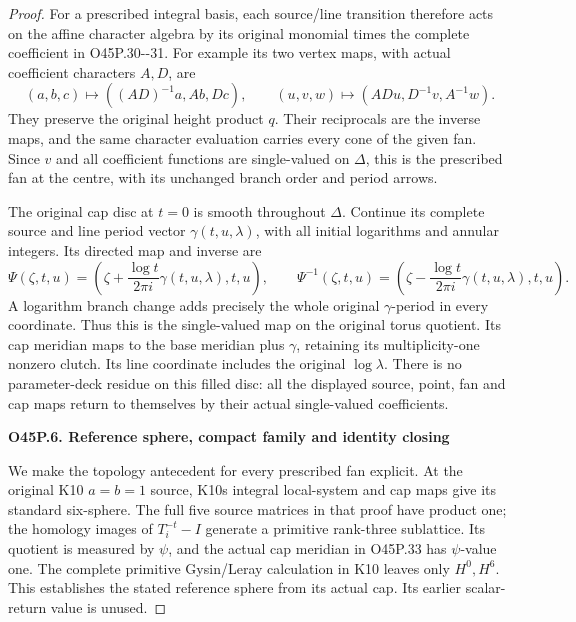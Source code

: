 \begin{proof}
For a prescribed integral basis, each source/line transition
therefore acts on the affine character algebra by its original
monomial times the complete coefficient in O45P.30-\/-31.
For example its two vertex maps, with actual coefficient
characters \(A,D\), are
\[
 (a,b,c)\mapsto((AD)^{-1}a,Ab,Dc),\qquad
 (u,v,w)\mapsto(ADu,D^{-1}v,A^{-1}w).
 \tag{O45P.32}
\]
They preserve the original height product \(q\).
Their reciprocals are the inverse maps, and the same
character evaluation carries every cone of the given fan.
Since \(v\) and all coefficient functions are single-valued
on \(\Delta\), this is the prescribed fan at the centre,
with its unchanged branch order and period arrows.

The original cap disc at \(t=0\) is smooth throughout
\(\Delta\). Continue its complete source and line period
vector \(\gamma(t,u,\lambda)\), with all initial logarithms
and annular integers. Its directed map and inverse are
\[
 \Psi(\zeta,t,u)=
   \left(\zeta+\frac{\log t}{2\pi i}\gamma(t,u,\lambda),t,u\right),
 \qquad
 \Psi^{-1}(\zeta,t,u)=
   \left(\zeta-\frac{\log t}{2\pi i}\gamma(t,u,\lambda),t,u\right).
 \tag{O45P.33}
\]
A logarithm branch change adds precisely the whole original
\(\gamma\)-period in every coordinate. Thus this is the
single-valued map on the original torus quotient.
Its cap meridian maps to the base meridian plus \(\gamma\),
retaining its multiplicity-one nonzero clutch. Its line
coordinate includes the original \(\log\lambda\).
There is no parameter-deck residue on this filled disc:
all the displayed source, point, fan and cap maps return
to themselves by their actual single-valued coefficients.

\par

\medskip\noindent\textbf{O45P.6. Reference sphere, compact family and identity closing}

\par\nobreak

We make the topology antecedent for every prescribed fan
explicit. At the original K10 \(a=b=1\) source, K10\textquotesingle s
integral local-system and cap maps give its standard
six-sphere. The full five source matrices in that proof
have product one; the homology images of \(T_i^{-t}-I\)
generate a primitive rank-three sublattice. Its quotient
is measured by \(\psi\), and the actual cap meridian in
O45P.33 has \(\psi\)-value one. The complete primitive
Gysin/Leray calculation in K10 leaves only \(H^0,H^6\).
This establishes the stated reference sphere from its
actual cap. Its earlier scalar-return value is unused.


\end{proof}
